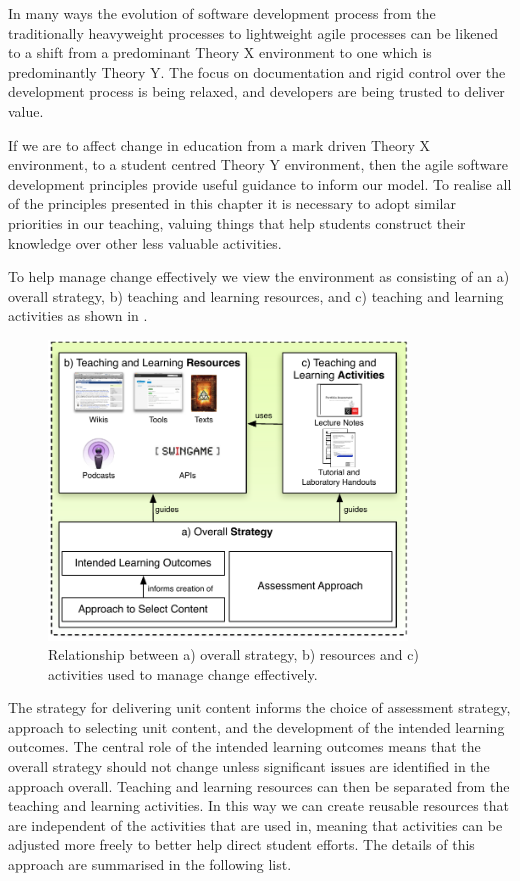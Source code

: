 In many ways the evolution of software development process from the traditionally heavyweight processes to lightweight agile processes can be likened to a shift from a predominant Theory X environment to one which is predominantly Theory Y. The focus on documentation and rigid control over the development process is being relaxed, and developers are being trusted to deliver value. 

If we are to affect change in education from a mark driven Theory X environment, to a student centred Theory Y environment, then the agile software development principles provide useful guidance to inform our model. To realise all of the principles presented in this chapter it is necessary to adopt similar priorities in our teaching, valuing things that help students construct their knowledge over other less valuable activities.

To help manage change effectively we view the environment as consisting of an a) overall strategy, b) teaching and learning resources, and c) teaching and learning activities as shown in . 

\begin{figure}[htbp]
	\centering
	\includegraphics[width=0.85\textwidth]{StrategyResourcesActivities}
	\caption{Relationship between a) overall strategy, b) resources and c) activities used to manage change effectively.}
	\label{fig:strategy}
\end{figure}

The strategy for delivering unit content informs the choice of assessment strategy, approach to selecting unit content, and the development of the intended learning outcomes. The central role of the intended learning outcomes means that the overall strategy should not change unless significant issues are identified in the approach overall. Teaching and learning resources can then be separated from the teaching and learning activities. In this way we can create reusable resources that are independent of the activities that are used in, meaning that activities can be adjusted more freely to better help direct student efforts. The details of this approach are summarised in the following list.


